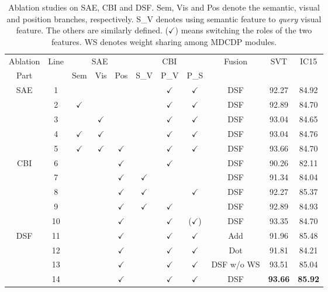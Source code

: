 \begin{table*}[h]
\centering
\caption{Ablation studies on SAE, CBI and DSF. Sem, Vis and Pos denote the semantic, visual and position branches, respectively. S\_V denotes using semantic feature to \emph{query} visual feature. The others are similarly defined. ($\checkmark$) means switching the roles of the two features. WS denotes weight sharing among MDCDP modules.}
\begin{tabular}{c|c|ccc|ccc|c|c c}
\hline
Ablation & \multirow{2}{*}{Line} &\multicolumn{3}{c|}{SAE} & \multicolumn{3}{c|}{CBI} & \multirow{2}{*}{Fusion}  & \multirow{2}{*}{SVT} & \multirow{2}{*}{IC15} \\
Part& & Sem & Vis & Pos & S\_V & P\_V & P\_S & & \\
\hline
\multirow{5}{*}{SAE} &1& & & & & $\checkmark$ & $\checkmark$ & DSF &92.27 & 84.92 \\
&2&$\checkmark$ &  & &  & $\checkmark$ & $\checkmark$ & DSF &92.89 & 84.70 \\
&3& & $\checkmark$ &  & & $\checkmark$ & $\checkmark$ & DSF & 93.04 & 84.65 \\
&4& $\checkmark$ & $\checkmark$ &  &  & $\checkmark$ & $\checkmark$ & DSF & 93.04 & 84.76 \\
&5& $\checkmark$ & $\checkmark$ & $\checkmark$ &  & $\checkmark$ & $\checkmark$ & DSF & 93.66 & 84.70 \\
\hline
\multirow{5}{*}{CBI}&6 &&& $\checkmark$ & & $\checkmark$ & & DSF & 90.26 & 82.11 \\
&7&& & $\checkmark$ & $\checkmark$ & & & DSF &91.34 & 84.04 \\
&8&& & $\checkmark$ & $\checkmark$ & & $\checkmark$ & DSF & 92.27 & 85.37 \\
&9&& & $\checkmark$ & $\checkmark$ & $\checkmark$ & & DSF & 92.89 & 84.93 \\
&10&& &$\checkmark$ & & $\checkmark$ & ($\checkmark$) & DSF & 93.35 & 84.70 \\
\hline
\multirow{3}{*}{DSF}&11&& & $\checkmark$ & & $\checkmark$ & $\checkmark$ & Add & 91.96 & 85.48 \\
&12&& & $\checkmark$ & & $\checkmark$ & $\checkmark$ & Dot & 91.81 & 84.21 \\
&13&& & $\checkmark$ & & $\checkmark$ & $\checkmark$ & DSF w/o WS & 93.51& 85.04 \\
\hline
&14&& & $\checkmark$ & & $\checkmark$ & $\checkmark$ & DSF & \textbf{93.66} & \textbf{85.92} \\
\hline
\end{tabular}
\label{table: Ablation study}
\end{table*}


